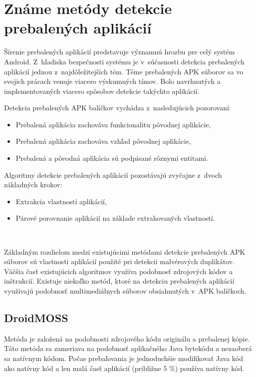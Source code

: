 \chapter{Známe metódy detekcie prebalených aplikácií}
\label{chap:zname-metody}
Šírenie prebalených aplikácií predstavuje významnú hrozbu pre celý systém Android. Z~hľadiska bezpečnosti systému je v~súčasnosti detekcia prebalených aplikácií jednou z~najdôležitejších tém.
Téme prebalených APK súborov sa vo svojich prácach venuje viacero výskumných tímov. Bolo navrhnutých a implementovaných viacero spôsobov detekcie takýchto aplikácií. 
\newline 

\noindent Detekcia prebalených APK balíčkov vychádza z~nasledujúcich pozorovaní:
\begin{itemize}
	\item Prebalená aplikácia zachováva funkcionalitu pôvodnej aplikácie,
	\item Prebalená aplikácia zachováva vzhľad pôvodnej aplikácie,
	\item Prebalená a pôvodná aplikácia sú podpísané rôznymi entitami.
\end{itemize} 

\noindent Algoritmy detekcie prebalených aplikácií pozostávajú zvyčajne z~dvoch základných krokov:
\begin{itemize}
	\item Extrakcia vlastností aplikácií,
	\item Párové porovnanie aplikácií na základe extrahovaných vlastností.
\end{itemize}
\ \newline

\noindent Základným rozdielom medzi existujúcimi metódami detekcie prebalených APK súborov sú vlastnosti aplikácií použité pri detekcii malvérových duplikátov. Väčšia časť existujúcich algoritmov využíva podobnosť zdrojových kódov a inštrukcií. Existuje niekoľko metód, ktoré na detekciu prebalených aplikácií využívajú podobnosť multimediálnych súborov obsiahnutých v~APK balíčkoch.

\section{DroidMOSS}
Metóda  je založená na podobnosti zdrojového kódu originálu a prebalenej kópie. Táto metóda sa zameriava na podobnosť aplikačného Java bytekódu a nezaoberá sa natívnym kódom. Počas prebaľovania je jednoduchšie modifikovať Java kód ako natívny kód a len malá časť aplikácií (približne 5 \%) používa natívny kód.


